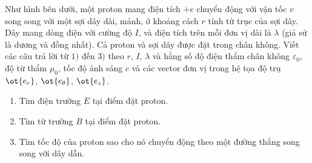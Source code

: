 \begin{vd}
Như hình bên dưới, một proton mang điện tích $+e$ chuyển động với vận tốc $v$ song song với một sợi dây dài, mảnh, ở khoảng cách $r$ tính từ trục của sợi dây. Dây mang dòng điện với cường độ $I$, và điện tích trên mỗi đơn vị dài là $\lambda$ (giả sử là dương và đồng nhất). Cả proton và sợi dây được đặt trong chân không. Viết các câu trả lời từ $1)$ đến $3)$ theo $r$, $I$, $\lambda$ và hằng số độ điện thẩm chân không $\varepsilon_0$, độ từ thẩm $\mu_0$, tốc độ ánh sáng $c$ và các vector đơn vị trong hệ tọa độ trụ $\ot{e_{r}}$, $\ot{e_{\theta}}$, $\ot{e_{z}}$.
\begin{enumerate}[1)]
    \item Tìm điện trường $E$ tại điểm đặt proton.
    \item Tìm từ trường $B$ tại điểm đặt proton.
    \item Tìm tốc độ của proton sao cho nó chuyển động theo một đường thẳng song song với dây dẫn.
\end{enumerate}
\begin{center}

\begin{tikzpicture}[x=0.75pt,y=0.75pt,yscale=-1,xscale=1]


\end{tikzpicture}
\end{center}
\end{vd}
